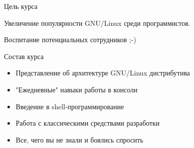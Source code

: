 \begin{frame}{Цель курса}
	\begin{center}
		\Huge
		Увеличение популярности GNU/Linux среди программистов.

		\hrulefill

		\normalsize
		Воспитание потенциальных сотрудников ;-)
	\end{center}
\end{frame}


\begin{frame}{Состав курса}
	\begin{itemize}
		\item Представление об архитектуре GNU/Linux дистрибутива
			\pause
		\item "Ежедневные" навыки работы в консоли
			\pause
		\item Введение в shell-программирование
			\pause
		\item Работа с классическими средствами разработки
			\pause
		\item Все, чего вы не знали и боялись спросить
	\end{itemize}
\end{frame}
